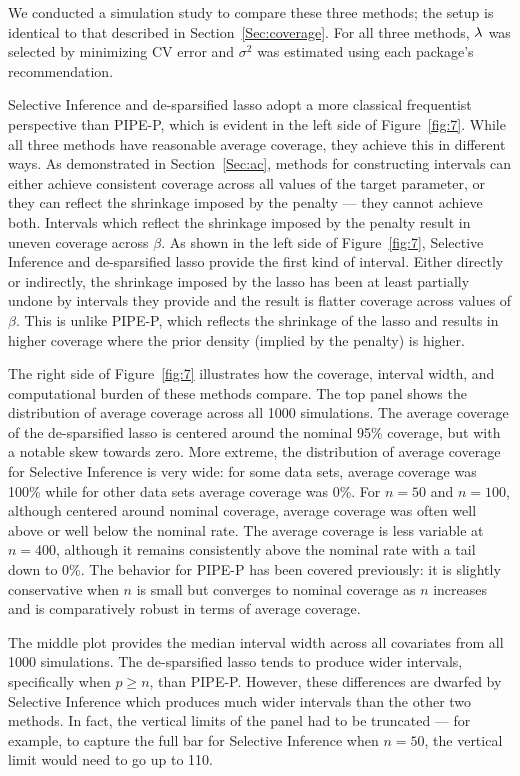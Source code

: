We conducted a simulation study to compare these three methods; the setup is identical to that described in Section~\ref{Sec:coverage}. For all three methods, $\lambda$ was selected by minimizing CV error and $\sigma^2$ was estimated using each package's recommendation.

Selective Inference and de-sparsified lasso adopt a more classical frequentist perspective than PIPE-P, which is evident in the left side of Figure~\ref{fig:7}. While all three methods have reasonable average coverage, they achieve this in different ways. As demonstrated in Section~\ref{Sec:ac}, methods for constructing intervals can either achieve consistent coverage across all values of the target parameter, or they can reflect the shrinkage imposed by the penalty --- they cannot achieve both. Intervals which reflect the shrinkage imposed by the penalty result in uneven coverage across $\beta$. As shown in the left side of Figure~\ref{fig:7}, Selective Inference and de-sparsified lasso provide the first kind of interval. Either directly or indirectly, the shrinkage imposed by the lasso has been at least partially undone by intervals they provide and the result is flatter coverage across values of $\beta$. This is unlike PIPE-P, which reflects the shrinkage of the lasso and results in higher coverage where the prior density (implied by the penalty) is higher.

The right side of Figure~\ref{fig:7} illustrates how the coverage, interval width, and computational burden of these methods compare. The top panel shows the distribution of average coverage across all 1000 simulations. The average coverage of the de-sparsified lasso is centered around the nominal 95\% coverage, but with a notable skew towards zero. More extreme, the distribution of average coverage for Selective Inference is very wide: for some data sets, average coverage was 100\% while for other data sets average coverage was 0\%. For $n = 50$ and $n = 100$, although centered around nominal coverage, average coverage was often well above or well below the nominal rate. The average coverage is less variable at $n = 400$, although it remains consistently above the nominal rate with a tail down to 0\%. The behavior for PIPE-P has been covered previously: it is slightly conservative when $n$ is small but converges to nominal coverage as $n$ increases and is comparatively robust in terms of average coverage.

The middle plot provides the median interval width across all covariates from all 1000 simulations. The de-sparsified lasso tends to produce wider intervals, specifically when $p \ge n$, than PIPE-P. However, these differences are dwarfed by Selective Inference which produces much wider intervals than the other two methods. In fact, the vertical limits of the panel had to be truncated --- for example, to capture the full bar for Selective Inference when $n = 50$, the vertical limit would need to go up to 110.

